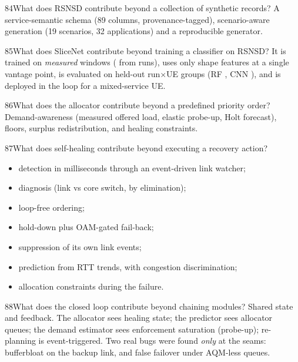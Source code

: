 \begin{qa}{84}{What does RSNSD contribute beyond a collection of synthetic records?}
A service-semantic schema (89 columns, provenance-tagged), scenario-aware generation (19 scenarios, 32 applications)
and a reproducible generator.
\end{qa}

\begin{qa}{85}{What does SliceNet contribute beyond training a classifier on RSNSD?}
It is trained on \emph{measured} windows (\NSnRows{} from \NSnRunsCount{} runs), uses only shape features at a single
vantage point, is evaluated on held-out run$\times$UE groups (RF \NSnRfFone, CNN \NSnCnnFone), and is deployed in the
loop for a mixed-service UE.
\end{qa}

\begin{qa}{86}{What does the allocator contribute beyond a predefined priority order?}
Demand-awareness (measured offered load, elastic probe-up, Holt forecast), floors, surplus redistribution, and
healing constraints.
\end{qa}

\begin{qa}{87}{What does self-healing contribute beyond executing a recovery action?}
\begin{itemize}
\item detection in milliseconds through an event-driven link watcher;
\item diagnosis (link vs core switch, by elimination);
\item loop-free ordering;
\item hold-down plus OAM-gated fail-back;
\item suppression of its own link events;
\item prediction from RTT trends, with congestion discrimination;
\item allocation constraints during the failure.
\end{itemize}
\end{qa}

\begin{qa}{88}{What does the closed loop contribute beyond chaining modules?}
Shared state and feedback. The allocator sees healing state; the predictor sees allocator queues; the demand estimator
sees enforcement saturation (probe-up); re-planning is event-triggered. Two real bugs were found \emph{only} at the
seams: bufferbloat on the backup link, and false failover under AQM-less queues.
\end{qa}

